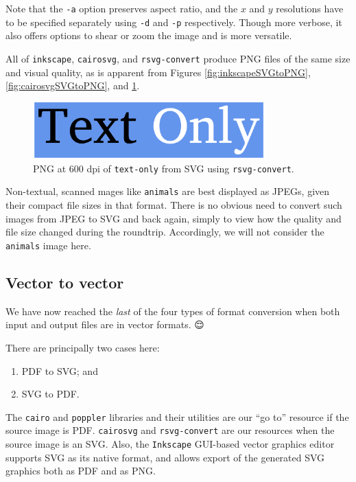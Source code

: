 \documentclass[
  11pt,
  british,
  a4paper,
]{article}
\providecommand{\tightlist}{%
  \setlength{\itemsep}{0pt}\setlength{\parskip}{0pt}}
\begin{document}
Note that the \texttt{-a} option preserves aspect ratio, and the \(x\)
and \(y\) resolutions have to be specified separately using \texttt{-d}
and \texttt{-p} respectively. Though more verbose, it also offers
options to shear or zoom the image and is more versatile.

All of \texttt{inkscape}, \texttt{cairosvg}, and \texttt{rsvg-convert}
produce PNG files of the same size and visual quality, as is apparent
from Figures \ref{fig:inkscapeSVGtoPNG}, \ref{fig:cairosvgSVGtoPNG}, and
\ref{fig:rsvg-convertSVGtoPNG}.

\begin{figure}
\hypertarget{fig:rsvg-convertSVGtoPNG}{%
\centering
\includegraphics[width=0.8\textwidth,height=\textheight]{images/text-only-600-dpi-rsvg-convert.png}
\caption{PNG at 600 dpi of \texttt{text-only} from SVG using
\texttt{rsvg-convert}.}\label{fig:rsvg-convertSVGtoPNG}
}
\end{figure}

Non-textual, scanned mages like \texttt{animals} are best displayed as
JPEGs, given their compact file sizes in that format. There is no
obvious need to convert such images from JPEG to SVG and back again,
simply to view how the quality and file size changed during the
roundtrip. Accordingly, we will not consider the \texttt{animals} image
here.

\hypertarget{vector-to-vector}{%
\subsection{Vector to vector}\label{vector-to-vector}}

We have now reached the \emph{last} of the four types of format
conversion when both input and output files are in vector formats.
 {😌} \normalfont

There are principally two cases here:

\begin{enumerate}
\def\labelenumi{\alph{enumi}.}
\tightlist
\item
  PDF to SVG; and
\item
  SVG to PDF.
\end{enumerate}

The \texttt{cairo} and \texttt{poppler} libraries and their utilities
are our ``go to'' resource if the source image is PDF. \texttt{cairosvg}
and \texttt{rsvg-convert} are our resources when the source image is an
SVG. Also, the \texttt{Inkscape} GUI-based vector graphics editor
supports SVG as its native format, and allows export of the generated
SVG graphics both as PDF and as PNG.
\end{document}
